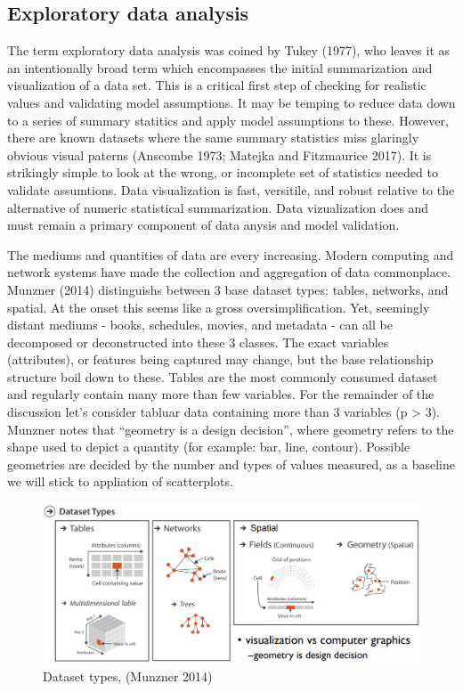 \documentclass[11,]{article}
\begin{document}
\hypertarget{exploratory-data-analysis}{%
\subsection{Exploratory data analysis}\label{exploratory-data-analysis}}

The term exploratory data analysis was coined by Tukey (1977), who leaves it as an intentionally broad term which encompasses the initial summarization and visualization of a data set. This is a critical first step of checking for realistic values and validating model assumptions. It may be temping to reduce data down to a series of summary statitics and apply model assumptions to these. However, there are known datasets where the same summary statistics miss glaringly obvious visual paterns (Anscombe 1973; Matejka and Fitzmaurice 2017). It is strikingly simple to look at the wrong, or incomplete set of statistics needed to validate assumtions. Data visualization is fast, versitile, and robust relative to the alternative of numeric statistical summarization. Data vizualization does and must remain a primary component of data anysis and model validation.

The mediums and quantities of data are every increasing. Modern computing and network systems have made the collection and aggregation of data commonplace. Munzner (2014) distinguishs between 3 base dataset types: tables, networks, and spatial. At the onset this seems like a gross oversimplification. Yet, seemingly distant mediums - books, schedules, movies, and metadata - can all be decomposed or deconstructed into these 3 classes. The exact variables (attributes), or features being captured may change, but the base relationship structure boil down to these. Tables are the most commonly consumed dataset and regularly contain many more than few variables. For the remainder of the discussion let's consider tabluar data containing more than 3 variables (p \textgreater{} 3). Munzner notes that ``geometry is a design decision'', where geometry refers to the shape used to depict a quantity (for example: bar, line, contour). Possible geometries are decided by the number and types of values measured, as a baseline we will stick to appliation of scatterplots.

\begin{figure}

{\centering \includegraphics[width=1\linewidth]{figures/tmunzner_vad16} 

}

\caption{Dataset types, (Munzner 2014)}\label{fig:datasetTypes}
\end{figure}
\end{document}
